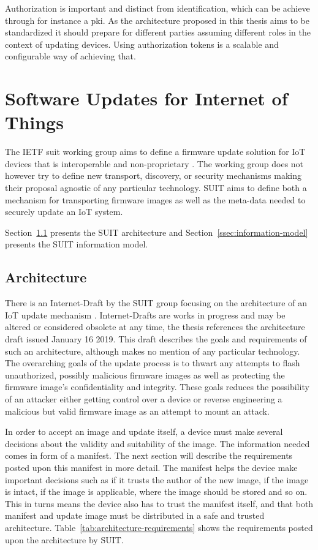 \documentclass[0-thesis.tex]{subfiles}
\begin{document}
Authorization is important and distinct from identification, which can be achieve through
for instance a \gls{pki}. As the architecture proposed in this thesis aims to be
standardized it should prepare for different parties assuming different roles in the
context of updating devices. Using authorization tokens is a scalable and configurable way
of achieving that.

\section{Software Updates for Internet of Things}
\label{sec:suit}
The IETF \acrfull{suit} working group aims to define a firmware update solution for IoT
devices that is interoperable and non-proprietary \parencite{suit}. The working group does
not however try to define new transport, discovery, or security mechanisms making their
proposal agnostic of any particular technology. SUIT aims to define both a mechanism for
transporting firmware images as well as the meta-data needed to securely update an IoT
system.

Section~\ref{ssec:architecture} presents the SUIT architecture and
Section~\ref{ssec:information-model} presents the SUIT information model.

\subsection{Architecture}
\label{ssec:architecture}
There is an Internet-Draft by the SUIT group focusing on the architecture of an IoT update
mechanism \parencite{suit-architecture}. Internet-Drafts are works in progress and may be
altered or considered obsolete at any time, the thesis references the architecture draft
issued January 16 2019. This draft describes the goals and requirements of such an
architecture, although makes no mention of any particular technology. The overarching
goals of the update process is to thwart any attempts to flash unauthorized, possibly
malicious firmware images as well as protecting the firmware image's confidentiality and
integrity. These goals reduces the possibility of an attacker either getting control over
a device or reverse engineering a malicious but valid firmware image as an attempt to
mount an attack.

In order to accept an image and update itself, a device must make several decisions about
the validity and suitability of the image. The information needed comes in form of a
manifest. The next section will describe the requirements posted upon this manifest in
more detail. The manifest helps the device make important decisions such as if it trusts
the author of the new image, if the image is intact, if the image is applicable, where the
image should be stored and so on. This in turns means the device also has to trust the
manifest itself, and that both manifest and update image must be distributed in a safe and
trusted architecture. Table~\ref{tab:architecture-requirements} shows the requirements
posted upon the architecture by SUIT.
\end{document}
